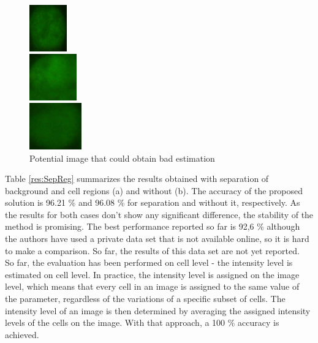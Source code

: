 \begin{figure}
	\begin{minipage}[h]{0.32\linewidth}
		\begin{flushright}
			\includegraphics[height=2cm]{Figures/intensity/image1}
		\end{flushright}
	\end{minipage}
	\begin{minipage}[h]{0.32\linewidth}
		\centering
		\includegraphics[height=2cm]{Figures/intensity/image2}
	\end{minipage}
	\begin{minipage}[h]{0.32\linewidth}
		\begin{flushleft}
			\includegraphics[height=2cm]{Figures/intensity/image3}
		\end{flushleft}
	\end{minipage}
	\caption{Potential image that could obtain bad estimation}
	\label{fig:Bad}
\end{figure}

Table \ref{res:SepReg} summarizes the results obtained with separation of background and cell regions (a) and without (b). The accuracy of the proposed solution is 96.21 \% and 96.08 \% for separation and without it, respectively. As the results for both cases don't show any significant difference, the stability of the method is promising.  The best performance reported so far is 92,6 \% although the authors have used a private data set that is not available online, so it is hard to make a comparison.  So far, the results of this data set are not yet reported. \\

So far, the evaluation has been performed on  cell level - the intensity level is estimated on cell level. In practice, the intensity level is assigned on the image level, which means that every cell in an image is assigned to the same value of the parameter, regardless of the variations of a specific subset of cells. The intensity level of an image is then determined by averaging the assigned intensity levels of the cells on the image. With that approach, a 100 \% accuracy is achieved.




